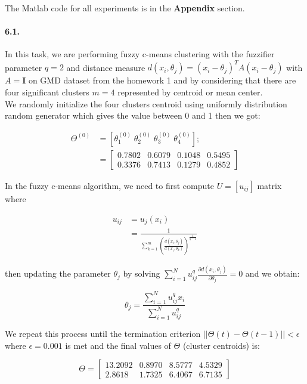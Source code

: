 \documentclass[a4paper]{article}
\begin{document}
\setcounter{page}{6}

\noindent The Matlab code for all experiments is in the \textbf{Appendix} section.

\paragraph{6.1.} In this task, we are performing fuzzy c-means clustering with the fuzzifier parameter $q=2$ and distance measure $d(x_i, \theta_j) = (x_i-\theta_j)^TA(x_i-\theta_j)$ with $A=\mathbf{I}$ on GMD dataset from the homework 1 and by considering that there are four significant clusters $m=4$ represented by centroid or mean center.\\

	We randomly initialize the four clusters centroid using uniformly distribution random generator which gives the value between 0 and 1 then we got:

	\begin{align}
		\Theta^{(0)} &= [\theta_1^{(0)} \; \theta_2^{(0)} \; \theta_3^{(0)} \; \theta_4^{(0)}]; \\
			&= \begin{bmatrix}
				0.7802  &  0.6079  &  0.1048  &  0.5495 \\
    			0.3376  &  0.7413  &  0.1279  &  0.4852
			\end{bmatrix}
	\end{align}

	In the fuzzy c-means algorithm, we need to first compute $U = [u_{ij}]$ matrix where

	\begin{align}
		u_{ij} &= u_j(x_i) \\
			&= \frac{1}{\sum_{k=1}^m (\frac{d(x_i,\theta_j)}{d(x_i,\theta_k)})^{\frac{1}{q-1}}}
	\end{align}

	then updating the parameter $\theta_j$ by solving $\sum_{i=1}^N u_{ij}^q \frac{\partial d(x_i,\theta_j)}{\partial \theta_j} = 0$ and we obtain:

	\begin{equation}
		\theta_j = \frac{\sum_{i=1}^N u_{ij}^qx_i}{\sum_{i=1}^N u_{ij}^q}
	\end{equation}

	We repeat this process until the termination criterion $||\Theta(t)-\Theta(t-1)|| < \epsilon$ where $\epsilon = 0.001$ is met and the final values of $\Theta$ (cluster centroids) is:

	\begin{equation}
		\Theta = \begin{bmatrix}
					13.2092  &  0.8970  &  8.5777  &  4.5329 \\
    				2.8618  &  1.7325  &  6.4067  &  6.7135
				\end{bmatrix}
	\end{equation}
\end{document}
